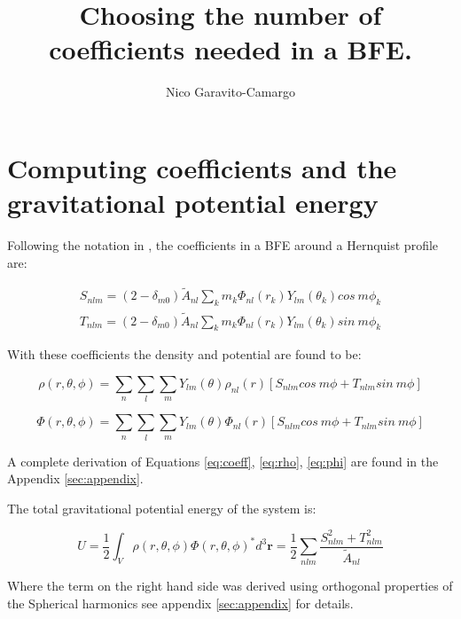 \documentclass[14pt]{article}
\title{Choosing the number of coefficients needed in a BFE.}
\author{Nico Garavito-Camargo}
\date{}
\begin{document}
\maketitle

\section*{Computing coefficients and the gravitational potential
energy}

Following the notation in \cite{Lowing11}, the coefficients in a BFE around a
Hernquist profile are:

\begin{equation}\label{eq:coeff}
  \begin{aligned}
    S_{nlm} = (2-\delta_{m0})\tilde{A}_{nl} \sum_k m_k
  \Phi_{nl}(r_k)Y_{lm}(\theta_k) cos\ m\phi_k \\
    T_{nlm} = (2-\delta_{m0})\tilde{A}_{nl} \sum_k m_k 
  \Phi_{nl}(r_k)Y_{lm}(\theta_k) sin\ m\phi_k 
  \end{aligned}
\end{equation}

With these coefficients the density and potential are found to be:


\begin{equation}\label{eq:rho}
  \rho(r, \theta, \phi) = \sum_{n} \sum_l \sum_m Y_{lm}(\theta) \rho_{nl}(r)
  \left[ S_{nlm} cos\ m \phi + T_{nlm} sin\ m\phi \right]
\end{equation}


\begin{equation}\label{eq:phi}
  \Phi(r, \theta, \phi) = \sum_{n} \sum_l \sum_m Y_{lm}(\theta) \Phi_{nl}(r)
  \left[ S_{nlm} cos\ m\phi + T_{nlm} sin\ m \phi \right]
\end{equation}

A complete derivation of Equations \ref{eq:coeff}, \ref{eq:rho}, \ref{eq:phi}
are found in the Appendix \ref{sec:appendix}.

The total gravitational potential energy of the system is:

\begin{equation}\label{eq:energy}
  U = \dfrac{1}{2} \int_V \rho(r, \theta, \phi)\Phi(r,\theta, \phi)^{*} d^3
  \textbf{r} =  \dfrac{1}{2}\sum_{nlm} \frac{S_{nlm}^2 +
  T_{nlm}^2}{\tilde{A}_{nl}} 
\end{equation}

Where the term on the right hand side was derived using orthogonal properties of
the Spherical harmonics see appendix \ref{sec:appendix} for details. 
\end{document}
